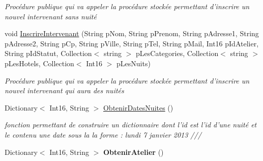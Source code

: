 \begin{DoxyCompactItemize}
\begin{DoxyCompactList}\small\item\em Procédure publique qui va appeler la procédure stockée permettant d'inscrire un nouvel intervenant sans nuité \end{DoxyCompactList}\item 
void \hyperlink{class_base_de_donnees_1_1_bdd_a2ecae01b408afab3f2457286b9bc6cc7}{Inscrire\+Intervenant} (String p\+Nom, String p\+Prenom, String p\+Adresse1, String p\+Adresse2, String p\+Cp, String p\+Ville, String p\+Tel, String p\+Mail, Int16 p\+Id\+Atelier, String p\+Id\+Statut, Collection$<$ string $>$ p\+Les\+Categories, Collection$<$ string $>$ p\+Les\+Hotels, Collection$<$ Int16 $>$ p\+Les\+Nuits)
\begin{DoxyCompactList}\small\item\em Procédure publique qui va appeler la procédure stockée permettant d'inscrire un nouvel intervenant qui aura des nuités \end{DoxyCompactList}\item 
Dictionary$<$ Int16, String $>$ \hyperlink{class_base_de_donnees_1_1_bdd_af48b871d33fdfd845de9d4012109d00f}{Obtenir\+Dates\+Nuites} ()
\begin{DoxyCompactList}\small\item\em fonction permettant de construire un dictionnaire dont l'id est l'id d'une nuité et le contenu une date sous la la forme \+: lundi 7 janvier 2013 /// \end{DoxyCompactList}\item 
\hypertarget{class_base_de_donnees_1_1_bdd_a8d465aeda4c9f18878abfdd9c73458d7}{Dictionary$<$ Int16, String $>$ {\bfseries Obtenir\+Atelier} ()}\label{class_base_de_donnees_1_1_bdd_a8d465aeda4c9f18878abfdd9c73458d7}


\end{DoxyCompactItemize}
